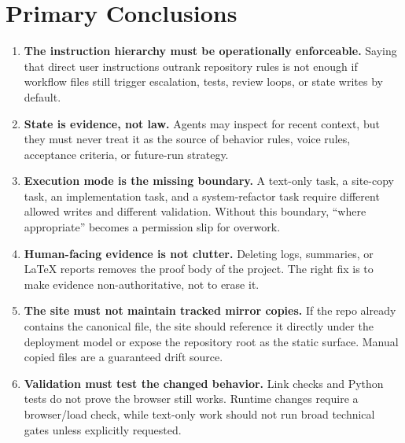 \documentclass[a4paper,11pt,openany]{report}
\newcommand{\safePath}[1]{\texttt{\detokenize{#1}}}
\begin{document}
\section{Primary Conclusions}

\begin{enumerate}
  \item \textbf{The instruction hierarchy must be operationally enforceable.}
    Saying that direct user instructions outrank repository rules is not enough
    if workflow files still trigger escalation, tests, review loops, or state
    writes by default.

  \item \textbf{State is evidence, not law.} Agents may inspect
    \safePath{agents/state/} for recent context, but they must never treat it as the
    source of behavior rules, voice rules, acceptance criteria, or future-run
    strategy.

  \item \textbf{Execution mode is the missing boundary.} A text-only task, a
    site-copy task, an implementation task, and a system-refactor task require
    different allowed writes and different validation. Without this boundary,
    ``where appropriate'' becomes a permission slip for overwork.

  \item \textbf{Human-facing evidence is not clutter.} Deleting logs, summaries,
    or LaTeX reports removes the proof body of the project. The right fix is to
    make evidence non-authoritative, not to erase it.

  \item \textbf{The site must not maintain tracked mirror copies.} If the repo
    already contains the canonical file, the site should reference it directly
    under the deployment model or expose the repository root as the static
    surface. Manual copied files are a guaranteed drift source.

  \item \textbf{Validation must test the changed behavior.} Link checks and
    Python tests do not prove the browser still works. Runtime changes require a
    browser/load check, while text-only work should not run broad technical gates
    unless explicitly requested.
\end{enumerate}

\end{document}
